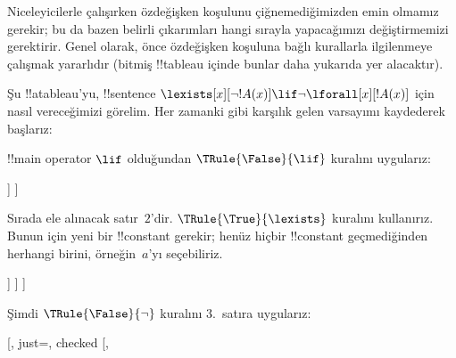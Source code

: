 



\begin{ex}
Niceleyicilerle çalışırken özdeğişken koşulunu çiğnemediğimizden emin olmamız
gerekir; bu da bazen belirli çıkarımları hangi sırayla yapacağımızı
değiştirmemizi gerektirir. Genel olarak, önce özdeğişken koşuluna bağlı
kurallarla ilgilenmeye çalışmak yararlıdır (bitmiş !!{tableau} içinde bunlar
daha yukarıda yer alacaktır).

Şu !!a{tableau}'yu, !!{sentence}
$\lexists[x][\lnot !A(x)] \lif \lnot \lforall[x][!A(x)]$ için nasıl
vereceğimizi görelim. Her zamanki gibi karşılık gelen
varsayımı kaydederek başlarız:
\begin{oltableau}
[\sFmla{\False}{\lexists[x][\lnot \formula{A}(x)]\lif \lnot
    \lforall[x][\formula{A}(x)]}, just=\TAss]
\end{oltableau}
!!{main operator} $\lif$ olduğundan $\TRule{\False}{\lif}$ kuralını
uygularız:
\begin{oltableau}
[\sFmla{\False}{\lexists[x][\lnot \formula{A}(x)]\lif \lnot
    \lforall[x][\formula{A}(x)]}, just=\TAss, checked
  [\sFmla{\True}{\lexists[x][\lnot \formula{A}(x)]},
    just={\TRule{\False}{\lif}[1]}
    [\sFmla{\False}{\lnot\lforall[x][\formula{A}(x)]},
      just={\TRule{\False}{\lif}[1]}]
  ]
]
\end{oltableau}
Sırada ele alınacak satır~$2$'dir. $\TRule{\True}{\lexists}$ kuralını
kullanırız. Bunun için yeni bir !!{constant} gerekir; henüz hiçbir
!!{constant} geçmediğinden herhangi birini, örneğin~$a$'yı seçebiliriz.
\begin{oltableau}
[\sFmla{\False}{\lexists[x][\lnot \formula{A}(x)]\lif \lnot
    \lforall[x][\formula{A}(x)]}, just=\TAss, checked
  [\sFmla{\True}{\lexists[x][\lnot \formula{A}(x)]},
    just={\TRule{\False}{\lif}[1]}, checked
    [\sFmla{\False}{\lnot\lforall[x][\formula{A}(x)]},
      just={\TRule{\False}{\lif}[1]}
      [\sFmla{\True}{\lnot\formula{A}(a)}, just={\TRule{\True}{\lexists}[2]}]
    ]
  ]
]
\end{oltableau}
Şimdi $\TRule{\False}{\lnot}$ kuralını $3$.~satıra uygularız:
\begin{oltableau}
[, just=\TAss, checked
  [,

\end{oltableau}
\end{ex}

